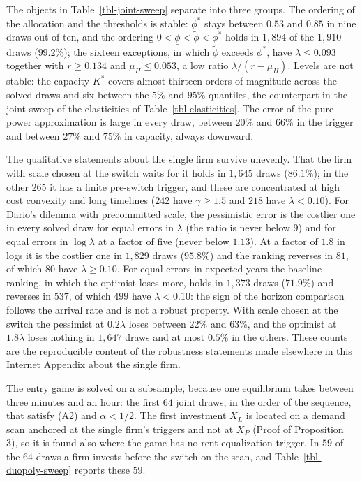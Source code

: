 \documentclass[
  11pt,
  letterpaper,
]{scrartcl}
\begin{document}
The objects in Table~\ref{tbl-joint-sweep} separate into three groups.
The ordering of the allocation and the thresholds is stable: \(\phi^*\)
stays between \(0.53\) and \(0.85\) in nine draws out of ten, and the
ordering \(0 < \underline{\phi} < \tilde{\phi} < \phi^*\) holds in
\(1{,}894\) of the \(1{,}910\) draws (\(99.2\%\)); the sixteen
exceptions, in which \(\tilde{\phi}\) exceeds \(\phi^*\), have
\(\lambda \leq 0.093\) together with \(r \geq 0.134\) and
\(\mu_H \leq 0.053\), a low ratio \(\lambda/(r - \mu_H)\). Levels are
not stable: the capacity \(K^*\) covers almost thirteen orders of
magnitude across the solved draws and six between the \(5\%\) and
\(95\%\) quantiles, the counterpart in the joint sweep of the
elasticities of Table~\ref{tbl-elasticities}. The error of the
pure-power approximation is large in every draw, between \(20\%\) and
\(66\%\) in the trigger and between \(27\%\) and \(75\%\) in capacity,
always downward.

The qualitative statements about the single firm survive unevenly. That
the firm with scale chosen at the switch waits for it holds in
\(1{,}645\) draws (\(86.1\%\)); in the other \(265\) it has a finite
pre-switch trigger, and these are concentrated at high cost convexity
and long timelines (\(242\) have \(\gamma \geq 1.5\) and \(218\) have
\(\lambda < 0.10\)). For Dario's dilemma with precommitted scale, the
pessimistic error is the costlier one in every solved draw for equal
errors in \(\lambda\) (the ratio is never below \(9\)) and for equal
errors in \(\log\lambda\) at a factor of five (never below \(1.13\)). At
a factor of \(1.8\) in logs it is the costlier one in \(1{,}829\) draws
(\(95.8\%\)) and the ranking reverses in \(81\), of which \(80\) have
\(\lambda \geq 0.10\). For equal errors in expected years the baseline
ranking, in which the optimist loses more, holds in \(1{,}373\) draws
(\(71.9\%\)) and reverses in \(537\), of which \(499\) have
\(\lambda < 0.10\): the sign of the horizon comparison follows the
arrival rate and is not a robust property. With scale chosen at the
switch the pessimist at \(0.2\lambda\) loses between \(22\%\) and
\(63\%\), and the optimist at \(1.8\lambda\) loses nothing in
\(1{,}647\) draws and at most \(0.5\%\) in the others. These counts are
the reproducible content of the robustness statements made elsewhere in
this Internet Appendix about the single firm.

The entry game is solved on a subsample, because one equilibrium takes
between three minutes and an hour: the first \(64\) joint draws, in the
order of the sequence, that satisfy (A2) and \(\alpha < 1/2\). The first
investment \(X_L\) is located on a demand scan anchored at the single
firm's triggers and not at \(X_P\) (Proof of Proposition 3), so it is
found also where the game has no rent-equalization trigger. In \(59\) of
the \(64\) draws a firm invests before the switch on the scan, and
Table~\ref{tbl-duopoly-sweep} reports these \(59\).
\end{document}
